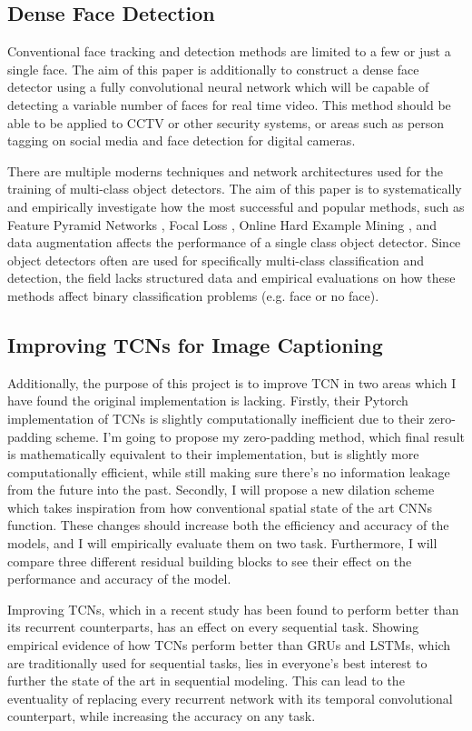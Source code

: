\documentclass[a4paper, twoside]{article}
\begin{document}
\subsection{Dense Face Detection}
Conventional face tracking and detection methods are limited to a few or just a single face. The aim of this paper is additionally to construct a dense face detector using a fully convolutional neural network which will be capable of detecting a variable number of faces for real time video. This method should be able to be applied to CCTV or other security systems, or areas such as person tagging on social media and face detection for digital cameras.

There are multiple moderns techniques and network architectures used for the training of multi-class object detectors. The aim of this paper is to systematically and empirically investigate how the most successful and popular methods, such as Feature Pyramid Networks \cite{fpn}, Focal Loss \cite{retinanet}, Online Hard Example Mining \cite{ohem}, and data augmentation affects the performance of a single class object detector. Since object detectors often are used for specifically multi-class classification and detection, the field lacks structured data and empirical evaluations on how these methods affect binary classification problems (e.g. face or no face).

\subsection{Improving TCNs for Image Captioning}
Additionally, the purpose of this project is to improve TCN in two areas which I have found the original implementation is lacking. Firstly, their Pytorch implementation of TCNs is slightly computationally inefficient due to their zero-padding scheme. I'm going to propose my zero-padding method, which final result is mathematically equivalent to their implementation, but is slightly more computationally efficient, while still making sure there's no information leakage from the future into the past. Secondly, I will propose a new dilation scheme which takes inspiration from how conventional spatial state of the art CNNs function. These changes should increase both the efficiency and accuracy of the models, and I will empirically evaluate them on two task. Furthermore, I will compare three different residual building blocks to see their effect on the performance and accuracy of the model.

Improving TCNs, which in a recent study \cite{tcn} has been found to perform better than its recurrent counterparts, has an effect on every sequential task. Showing empirical evidence of how TCNs perform better than GRUs and LSTMs, which are traditionally used for sequential tasks, lies in everyone's best interest to further the state of the art in sequential modeling. This can lead to the eventuality of replacing every recurrent network with its temporal convolutional counterpart, while increasing the accuracy on any task.
\end{document}
